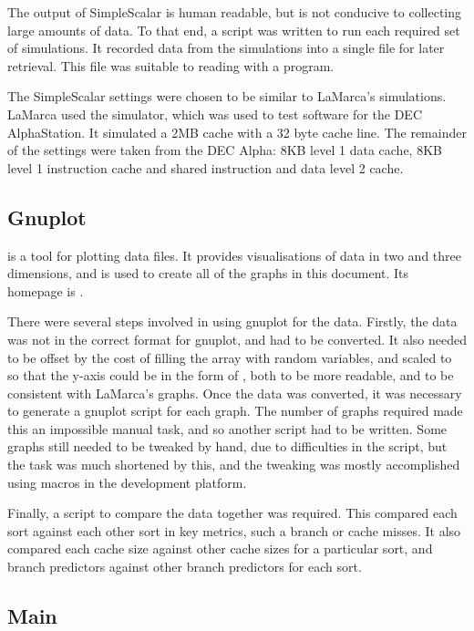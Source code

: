 The output of SimpleScalar is human readable, but is not conducive to collecting
large amounts of data. To that end, a script was written to run each required
set of simulations. It recorded data from the simulations into a single file for
later retrieval. This file was suitable to reading with a  program.

The SimpleScalar settings were chosen to be similar to LaMarca's simulations.
LaMarca used the  simulator, which was used to test software for the DEC
AlphaStation. It simulated a 2MB cache with a 32 byte cache line. The remainder
of the settings were taken from the DEC Alpha: 8KB level 1 data cache, 8KB level
1 instruction cache and shared instruction and data level 2 cache. 

\subsection{Gnuplot}
\label{Gnuplot}
 is a tool for plotting data files. It provides visualisations of data in
two and three dimensions, and is used to create all of the graphs in this
document. Its homepage is .

There were several steps involved in using gnuplot for the data. Firstly, the
data was not in the correct format for gnuplot, and had to be converted. It also
needed to be offset by the cost of filling the array with random variables, and
scaled to so that the y-axis could be in the form of ,
both to be more readable, and to be consistent with LaMarca's graphs. Once the data
was converted, it was necessary to generate a gnuplot script for each graph.
The number of graphs required made this an
impossible manual task, and so another script had to be written.  Some graphs
still needed to be tweaked by hand, due to difficulties in the script, but the
task was much shortened by this, and the tweaking was mostly accomplished using
macros in the development platform.

Finally, a script to compare the data together was required.  This compared each
sort against each other sort in key metrics, such a branch or cache misses. It
also compared each cache size against other cache sizes for a particular sort,
and branch predictors against other branch predictors for each sort. 

\subsection{Main}
\label{Main}

